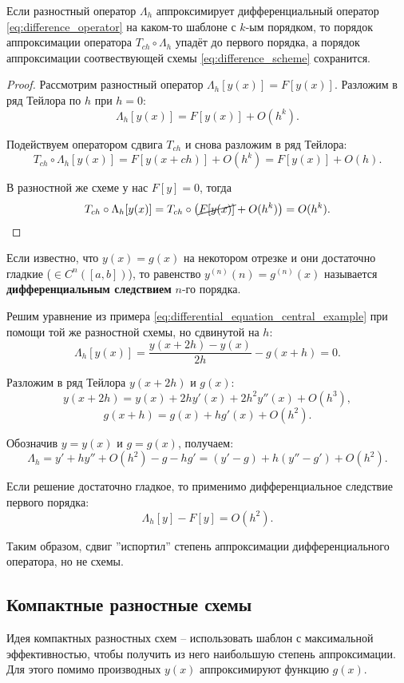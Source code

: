 \documentclass[../main.tex]{subfile}
\begin{document}
\begin{theorem}
	Если разностный оператор $\Lambda_h$ аппроксимирует дифференциальный
	оператор \eqref{eq:difference_operator} на каком-то шаблоне с $k$-ым
	порядком, то порядок аппроксимации оператора $T_{ch}\circ\Lambda_h$
	упадёт до первого порядка, а порядок аппроксимации соотвествующей
	схемы \eqref{eq:difference_scheme} сохранится.
\end{theorem}

\begin{proof}
	Рассмотрим разностный оператор $\Lambda_h[y(x)]=F[y(x)]$.
	Разложим в ряд Тейлора по $h$ при $h=0$:
	\[\Lambda_h[y(x)]=F[y(x)]+O(h^k).\]

	Подействуем оператором сдвига $T_{ch}$ и снова разложим в ряд Тейлора:
	\[T_{ch}\circ\Lambda_h[y(x)]=F[y(x+ch)]+O(h^k)=F[y(x)]+O(h).\]

	В разностной же схеме у нас $F[y]=0$, тогда
	\[T_{ch}\circ\Lambda_h[y(x)]=T_{ch}\circ\big(\cancel{F[y(x)]}+O(h^k)
	\big)=O(h^k).\]
\end{proof}

\begin{define}
	Если известно, что $y(x)=g(x)$ на некотором отрезке и они достаточно
	гладкие ($\in C^n([a,b])$), то равенство $y^{(n)}(n)=g^{(n)}(x)$
	называется \textbf{дифференциальным следствием} $n$-го порядка.
\end{define}

\begin{example}\label{eq:differential_equation_shift_example}
	Решим уравнение из примера
	\eqref{eq:differential_equation_central_example} при помощи той же
	разностной схемы, но сдвинутой на $h$:
	\[\Lambda_h[y(x)]=\frac{y(x+2h)-y(x)}{2h}-g(x+h)=0.\]

	Разложим в ряд Тейлора $y(x+2h)$ и $g(x)$:
	\[y(x+2h)=y(x)+2hy'(x)+2h^2y''(x)+O(h^3),\]
	\[g(x+h)=g(x)+hg'(x)+O(h^2).\]

	Обозначив $y=y(x)$ и $g=g(x)$, получаем:
	\[\Lambda_h=y'+hy''+O(h^2)-g-hg'=
	(y'-g)+h(y''-g')+O(h^2).\]

	Если решение достаточно гладкое, то применимо дифференциальное
	следствие первого порядка:
	\[\Lambda_h[y]-F[y]=O(h^2).\]

	Таким образом, сдвиг ''испортил'' степень аппроксимации
	дифференциального оператора, но не схемы.
\end{example}
\newpage

\subsection{Компактные разностные схемы}
Идея компактных разностных схем -- использовать шаблон с максимальной
эффективностью, чтобы получить из него наибольшую степень аппроксимации. Для
этого помимо производных $y(x)$ аппроксимируют функцию $g(x)$.
\end{document}
